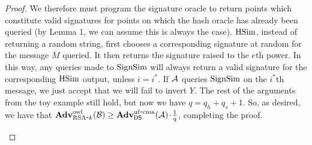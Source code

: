 \begin{proof}
We therefore must program the signature oracle to return points which constitute valid signatures for points on which the hash oracle has already been queried (by Lemma 1, we can assume this is always the case). $\textnormal{HSim}$, instead of returning a random string, first chooses a corresponding signature at random for the message $M$ queried. It then returns the signature raised to the $e$th power. In this way, any queries made to $\textnormal{SignSim}$ will always return a valid signature for the corresponding $\textnormal{HSim}$ output, unless $i=i^*$. If ${\mathcal A}$ queries $\textnormal{SignSim}$ on the $i^*$th message, we just accept that we will fail to invert $Y$. The rest of the arguments from the toy example still hold, but now we have $q=q_h+q_s+1$. So, as desired, we have that $\mathbf{Adv}^{\mathrm{owf}}_{{\textnormal{RSA}\mbox{-} k}}({\mathcal B}) \ge \mathbf{Adv}^{\mathrm{uf\mbox{-} cma}}_{{\mathsf{DS}}}({\mathcal A}){\hspace{-0.1ex}}{\hspace{-0.1ex}}{\hspace{-0.1ex}}\cdot{\hspace{-0.1ex}}{\hspace{-0.1ex}}{\hspace{-0.1ex}}\frac{1}{q}$, completing the proof.



\begin{figure}
\centering
{}
\end{figure}
\end{proof}
